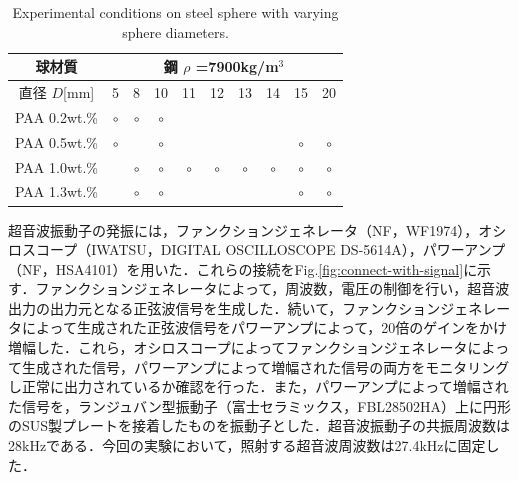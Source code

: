 \begin{table}[H]
    \centering
    \caption{Experimental conditions on steel sphere with varying sphere diameters.}
    \label{table:exp-conditions-dia}
    \begin{tabular}{c|c|c|c|c|c|c|c|c|c}\hline
        球材質       & \multicolumn{9}{|c}{鋼 $\rho$ =7900kg/m$^3$}                                                                                 \\ \hline
        直径 $D$[mm] & 5                                            & 8       & 10      & 11      & 12      & 13      & 14      & 15      & 20      \\ \hline \hline
        PAA 0.2wt.\% & $\circ$                                      & $\circ$ & $\circ$ &         &         &         &         &         &         \\ \hline
        PAA 0.5wt.\% & $\circ$                                      &         & $\circ$ &         &         &         &         & $\circ$ & $\circ$ \\ \hline
        PAA 1.0wt.\% &                                              & $\circ$ & $\circ$ & $\circ$ & $\circ$ & $\circ$ & $\circ$ & $\circ$ & $\circ$ \\ \hline
        PAA 1.3wt.\% &                                              & $\circ$ & $\circ$ &         &         &         &         & $\circ$ & $\circ$ \\ \hline
    \end{tabular}
\end{table}

超音波振動子の発振には，ファンクションジェネレータ（NF，WF1974），オシロスコープ（IWATSU，DIGITAL OSCILLOSCOPE DS-5614A），パワーアンプ（NF，HSA4101）を用いた．これらの接続をFig.\ref{fig:connect-with-signal}に示す．ファンクションジェネレータによって，周波数，電圧の制御を行い，超音波出力の出力元となる正弦波信号を生成した．続いて，ファンクションジェネレータによって生成された正弦波信号をパワーアンプによって，20倍のゲインをかけ増幅した．これら，オシロスコープによってファンクションジェネレータによって生成された信号，パワーアンプによって増幅された信号の両方をモニタリングし正常に出力されているか確認を行った．また，パワーアンプによって増幅された信号を，ランジュバン型振動子（富士セラミックス，FBL28502HA）上に円形のSUS製プレートを接着したものを振動子とした．超音波振動子の共振周波数は28kHzである．今回の実験において，照射する超音波周波数は27.4kHzに固定した．

